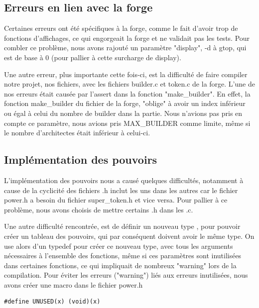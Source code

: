 \documentclass{article}
\begin{document}
        \subsection{Erreurs en lien avec la forge} %
         \hspace{1em} Certaines erreurs ont été spécifiques à la forge, comme le fait d'avoir trop de fonctions d'affichages, ce qui engorgeait la forge et ne validait pas les tests. Pour combler ce problème, nous avons rajouté un paramètre "display", -d  à gtop, qui est de base à 0 (pour pallier à cette surcharge de display).

            Une autre erreur, plus importante cette fois-ci, est la difficulté de faire compiler notre projet, nos fichiers, avec les fichiers builder.c et token.c de la forge. L'une de nos erreurs était causée par l'assert dans la fonction "make\_builder". En effet, la fonction make\_builder du fichier de la forge, "oblige" à avoir un index inférieur ou égal à celui du nombre de builder dans la partie. Nous n'avions pas pris en compte ce paramètre, nous avions pris MAX\_BUILDER comme limite, même si le nombre d'architectes était inférieur à celui-ci. 
            
         \subsection{Implémentation des pouvoirs }
         \hspace{1em} L'implémentation des pouvoirs nous a causé quelques difficultés, notamment à cause de la cyclicité des fichiers .h inclut les uns dans les autres car le fichier power.h a besoin du fichier super\_token.h et vice versa. Pour pallier à ce problème, nous avons choisis de mettre certains .h dans les .c.

            Une autre difficulté rencontrée, est de définir un nouveau type , pour pouvoir créer un tableau des pouvoirs, qui par conséquent doivent avoir le même type. On use alors d'un typedef pour créer ce nouveau type, avec tous les arguments nécessaires à l'ensemble des fonctions, même si ces paramètres sont inutilisées dans certaines fonctions, ce qui impliquait de nombreux "warning" lors de la compilation. Pour éviter les erreurs ("warning") liés aux erreurs inutilisées, nous avons créer une macro dans le fichier power.h

            
            \begin{lstlisting}[frame=single, caption={Macro UNUSED value },label=unused]
            #define UNUSED(x) (void)(x)

    \end{lstlisting}
            
\end{document}
